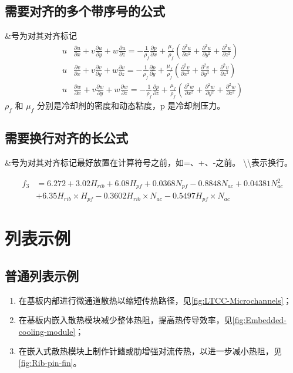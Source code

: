 \subsection{需要对齐的多个带序号的公式}
\&号为对其对齐标记
\begin{align}%
    u & \frac{\partial u}{\partial x}+v \frac{\partial u}{\partial y}+w \frac{\partial u}{\partial z}=-\frac{1}{\rho_{f}} \frac{\partial p}{\partial x}+\frac{\mu_{f}}{\rho_{f}}\left(\frac{\partial^{2} u}{\partial x^{2}}+\frac{\partial^{2} u}{\partial y^{2}}+\frac{\partial^{2} u}{\partial z^{2}}\right) \\
    u & \frac{\partial v}{\partial x}+v \frac{\partial v}{\partial y}+w \frac{\partial v}{\partial z}=-\frac{1}{\rho_{f}} \frac{\partial p}{\partial y}+\frac{\mu_{f}}{\rho_{f}}\left(\frac{\partial^{2} v}{\partial x^{2}}+\frac{\partial^{2} v}{\partial y^{3}}+\frac{\partial^{2} v}{\partial z^{3}}\right) \\
    u & \frac{\partial w}{\partial x}+v \frac{\partial w}{\partial y}+w \frac{\partial w}{\partial z}=-\frac{1}{\rho_{f}} \frac{\partial p}{\partial z}+\frac{\mu_{f}}{\rho_{f}}\left(\frac{\partial^{2} w}{\partial x^{2}}+\frac{\partial^{2} w}{\partial y^{2}}+\frac{\partial^{2} w}{\partial z^{2}}\right)
\end{align}
$\rho_{f}$ 和 $\mu_{f}$ 分别是冷却剂的密度和动态粘度，p 是冷却剂压力。


\subsection{需要换行对齐的长公式}

\&号为对其对齐标记最好放置在计算符号之前，如=、+、-之前。
\backslash\backslash 表示换行。

\begin{equation}\label{eq:P}
    \begin{split}
        f_3 & = 6.272 + 3.02 H_{rib} + 6.08 H_{pf} + 0.0368 N_{pf} - 0.8848 N_{ac} + 0.04381 N_{ac}^2\\
        & + 6.35 H_{rib} \times H_{pf} - 0.3602 H_{rib}\times N_{ac} - 0.5497 H_{pf}\times N_{ac}
    \end{split}
\end{equation}


\section{列表示例}

\subsection{普通列表示例}
\begin{enumerate}
    \item 在基板内部进行微通道散热以缩短传热路径，见\cref{fig:LTCC-Microchannels}；
    \item 在基板内嵌入散热模块减少整体热阻，提高热传导效率，见\cref{fig:Embedded-cooling-module}；
    \item 在嵌入式散热模块上制作针鳍或肋增强对流传热，以进一步减小热阻，见\cref{fig:Rib-pin-fin}。
\end{enumerate}

